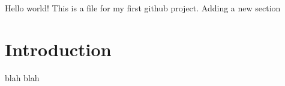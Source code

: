 \documentclass{article}
\begin{document}
Hello world! This is a file for my first github project. Adding a new section
\section{Introduction}

blah blah
\end{document}
